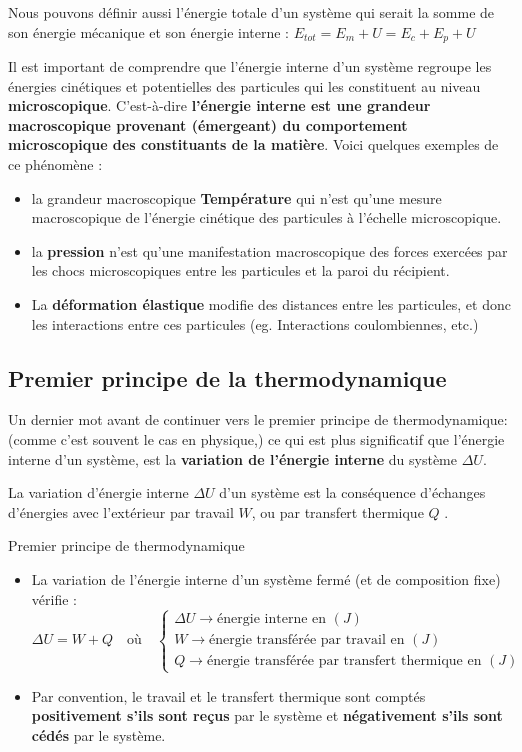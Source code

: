 \documentclass[11pt,a4paper]{article}
\begin{document}
Nous pouvons définir aussi l'énergie totale d'un système qui serait la somme de son énergie mécanique et son énergie interne : $E_{tot} = E_m + U = E_c + E_p + U$

\begin{rmrq}
Il est important de comprendre que l’énergie interne d’un système regroupe les énergies cinétiques et potentielles des particules qui les constituent au niveau \textbf{microscopique}.  C'est-à-dire \textbf{l’énergie interne est une grandeur macroscopique provenant (émergeant) du comportement microscopique des constituants de la matière}.  Voici quelques exemples de ce phénomène :
\begin{itemize}
    \item la grandeur macroscopique \textbf{Température} qui n’est qu’une mesure macroscopique de l’énergie cinétique des particules à l’échelle microscopique.
    \item la \textbf{pression} n’est qu’une manifestation macroscopique des forces exercées par les chocs microscopiques entre les particules et la paroi du récipient.
    \item La \textbf{déformation élastique} modifie des distances entre les particules, et donc les interactions entre ces particules (eg. Interactions coulombiennes, etc.)
\end{itemize}
\end{rmrq}

\subsection{Premier principe de la thermodynamique}

Un dernier mot avant de continuer vers le premier principe de thermodynamique: (comme c'est souvent le cas en physique,) ce qui est plus significatif que l'énergie interne d'un système, est la \textbf{variation de l'énergie interne} du système $\Delta U$. 

La variation d’énergie interne $\Delta U$ d’un système est la conséquence d’échanges d’énergies avec l’extérieur par travail $W$, ou par transfert thermique $Q$ . 

\begin{defn}{Premier principe de thermodynamique}
\begin{itemize}
    \item La variation de l'énergie interne d'un système fermé (et de composition fixe) vérifie : 
\[  \Delta U = W + Q   \quad \text{où} \quad 
\begin{cases}
    \Delta U \rightarrow \text{énergie interne en }(J) \\
    W \rightarrow \text{énergie transférée par travail en }(J) \\ 
    Q \rightarrow \text{énergie transférée par transfert thermique en }(J)
\end{cases}\]
    \item Par convention, le travail et le transfert thermique sont comptés \textbf{positivement s’ils sont reçus} par le système et \textbf{négativement s’ils sont cédés} par le système. 
\end{itemize}
\end{defn}
\end{document}
